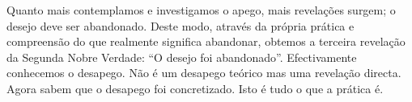 Quanto mais contemplamos e investigamos o apego, mais revelações surgem; o
desejo deve ser abandonado. Deste modo, através da própria prática e compreensão
do que realmente significa abandonar, obtemos a terceira revelação da Segunda
Nobre Verdade: “O desejo foi abandonado”. Efectivamente conhecemos o desapego.
Não é um desapego teórico mas uma revelação directa. Agora sabem que o desapego
foi concretizado. Isto é tudo o que a prática é.

